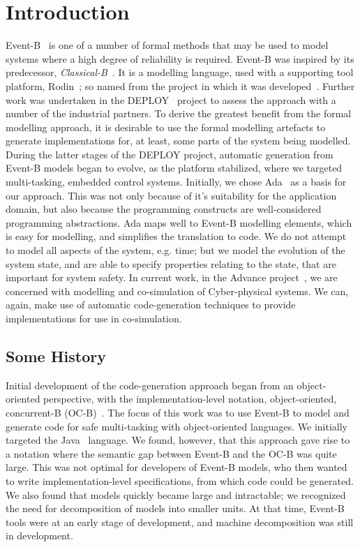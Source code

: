 \section{Introduction}\label{intro}
Event-B~\cite{ABR10} is one of a number of formal methods that may be used to model systems where a high degree of reliability is required. Event-B was inspired by its predecessor, \emph{Classical-B}~\cite{TheBBook}. It is a modelling language, used with a supporting tool platform, Rodin~\cite{abrial10rodin}; so named from the project in which it was developed~\cite{RodinTool}. Further work was undertaken in the DEPLOY~\cite{DEPLOY} project to assess the approach with a number of the industrial partners. To derive the greatest benefit from the formal modelling approach, it is desirable to use the formal modelling artefacts to generate implementations for, at least, some parts of the system being modelled. During the latter stages of the DEPLOY project, automatic generation from Event-B models began to evolve, as the platform stabilized, where we targeted multi-tasking, embedded control systems. Initially, we chose Ada~\cite{ada2005} as a basis for our approach. This was not only because of it's suitability for the application domain, but also because the programming constructs are well-considered programming abstractions. Ada maps well to Event-B modelling elements, which is easy for modelling, and simplifies the translation to code. We do not attempt to model all aspects of the system, e.g. time; but we model the evolution of the system state, and are able to specify properties relating to the state, that are important for system safety. In current work, in the Advance project~\cite{advance}, we are concerned with modelling and co-simulation of Cyber-physical systems. We can, again, make use of automatic code-generation techniques to provide implementations for use in co-simulation.    


\subsection{Some History}
Initial development of the code-generation approach began from an object-oriented perspective, with the implementation-level notation, object-oriented, concurrent-B (OC-B)~\cite{Edmunds2009}. The focus of this work was to use Event-B  to model and generate code for safe multi-tasking with object-oriented languages. We initially targeted the Java~\cite{JavaSpec} language. We found, however, that this approach gave rise to a notation where the semantic gap between Event-B and the OC-B was quite large. This was not optimal for developers of Event-B models, who then wanted to write implementation-level specifications, from which code could be generated. We also found that models quickly became large and intractable; we recognized the need for decomposition of models into smaller units. At that time, Event-B tools were at an early stage of development, and machine decomposition was still in development. 

